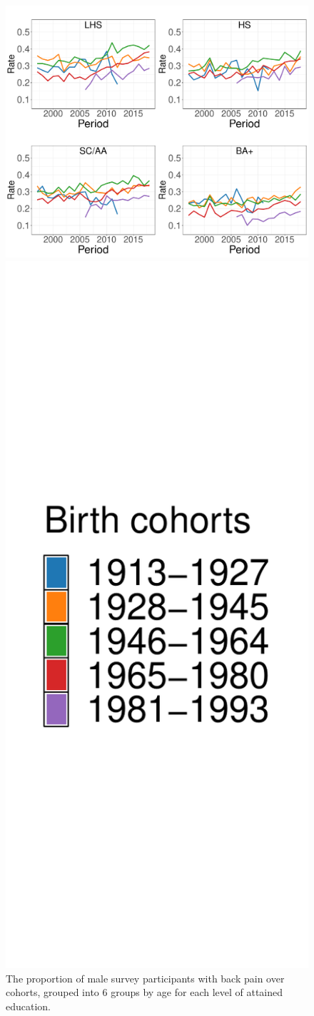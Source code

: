 \begin{figure}[!ht]
    \centering
    \begin{minipage}{.5\textwidth}
      \centering
      \includegraphics[width=1.6\linewidth]{Figures/rateplot_cohort_m.pdf}
    \end{minipage}%
    \begin{minipage}{.5\textwidth}
      \hfill
      \includegraphics[width=0.4\linewidth]{Figures/rateplot_cohort_legend_m.pdf}
    \end{minipage}
    \caption{The proportion of male survey participants with back pain over cohorts, grouped into $6$ groups by age for each level of attained education.}
    \label{figure:explorative:rateplot_cohort_m}
\end{figure}

